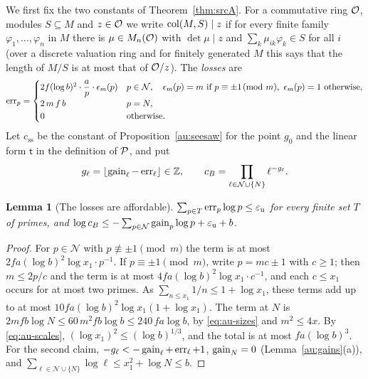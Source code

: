 \documentclass[10pt]{amsart}
\newtheorem{lemma}[theorem]{Lemma}
\theoremstyle{definition}
\theoremstyle{remark}
\newcommand{\Z}{\mathbb Z}
\begin{document}
We first fix the two constants of Theorem~\ref{thm:srcA}. For a commutative ring $\mathcal O$, modules
$S\subseteq M$ and $z\in\mathcal O$ we write $\operatorname{col}(M,S)\mid z$ if for every finite family
$\varphi_1,\dots,\varphi_n$ in $M$ there is $\mu\in M_n(\mathcal O)$ with $\det\mu\mid z$ and
$\sum_k\mu_{ik}\varphi_k\in S$ for all $i$ (over a discrete valuation ring and for finitely
generated $M$ this says that the length of $M/S$ is at most that of $\mathcal O/z$). The \emph{losses}
are
\begin{equation}\label{eq:au-err}
\operatorname{err}_p=\begin{cases}
2f(\log b)^2\cdot\dfrac ap\cdot\epsilon_m(p)&p\in\mathcal N,\quad\epsilon_m(p)=m\text{ if }p\equiv
\pm1\!\!\pmod m,\ \epsilon_m(p)=1\text{ otherwise},\\[4pt]
2\,m\,f\,b&p=N,\\
0&\text{otherwise.}
\end{cases}
\end{equation}
Let $c_{\mathrm{ss}}$ be the constant of Proposition~\ref{au:seesaw} for the point $g_0$ and the
linear form $\mathsf t$ in the definition of $\mathcal P$, and put
\[
g_\ell=\lfloor\augain_\ell-\auerr_\ell\rfloor\in\Z,\qquad\aucB=\prod_{\ell\in\mathcal N\cup\{N\}}
\ell^{-g_\ell} .
\]

\begin{lemma}[The losses are affordable]\label{au:errsum}
$\sum_{p\in T}\operatorname{err}_p\log p\le\varepsilon_{\mathrm u}$ for every finite set $T$ of primes, and
$\log c_B\le-\sum_{p\in\mathcal N}\operatorname{gain}_p\log p+\varepsilon_{\mathrm u}+b$.
\end{lemma}
\begin{proof}
For $p\in\mathcal N$ with $p\not\equiv\pm1\pmod m$ the term is at most
$2fa(\log b)^2\log x_1\cdot p^{-1}$. If $p\equiv\pm1\pmod m$, write $p=mc\pm1$ with $c\ge1$; then
$m\le2p/c$ and the term is at most $4fa(\log b)^2\log x_1\cdot c^{-1}$, and each $c\le x_1$
occurs for at most two primes. As $\sum_{n\le x_1}1/n\le1+\log x_1$, these terms add up to at most
$10fa(\log b)^2\log x_1(1+\log x_1)$. The term at $N$ is $2mfb\log N\le60\,m^2fb\log b\le
240\,fa\log b$, by \eqref{eq:au-sizes} and $m^2\le4x$. By \eqref{eq:au-scales},
$(\log x_1)^2\le(\log b)^{1/3}$, and the total is at most $fa(\log b)^3$. For the second claim,
$-g_\ell<-\operatorname{gain}_\ell+\operatorname{err}_\ell+1$, $\operatorname{gain}_N=0$ (Lemma~\ref{au:gains}(a)), and
$\sum_{\ell\in\mathcal N\cup\{N\}}\log\ell\le x_1^2+\log N\le b$.
\end{proof}
\end{document}
